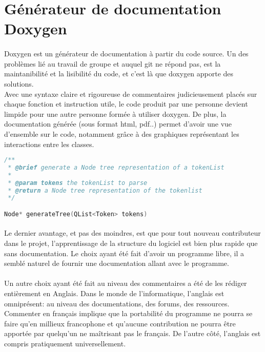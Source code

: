     \newpage

    \section{Générateur de documentation Doxygen}
        \paragraph{}
            Doxygen est un générateur de documentation à partir du code source. Un des problèmes lié au travail de groupe et auquel git ne répond pas, est la maintanibilité et la lisibilité du code, et c'est là que doxygen apporte des solutions.
            \\ Avec une syntaxe claire et rigoureuse de commentaires judicieusement placés sur chaque fonction et instruction utile, le code produit par une personne devient limpide pour une autre personne formée à utiliser doxygen. De plus, la documentation générée (sous format html, pdf..) permet d'avoir une vue d'ensemble sur le code, notamment grâce à des graphiques représentant les interactions entre les classes.

        \begin{lstlisting}[frame=single, language=C++, caption=Exemple de  commentaire utilisant la syntaxe de doxygen] 
/**
 * @brief generate a Node tree representation of a tokenList
 *
 * @param tokens the tokenList to parse
 * @return a Node tree representation of the tokenlist
 */

Node* generateTree(QList<Token> tokens)
        \end{lstlisting}


        \paragraph{}
            Le dernier avantage, et pas des moindres, est que pour tout nouveau contributeur dans le projet, l'apprentissage de la structure du logiciel est bien plus rapide que sans documentation. Le choix ayant été fait d'avoir un programme libre, il a semblé naturel de fournir une documentation allant avec le programme.
            
        \paragraph{}
            Un autre choix ayant été fait au niveau des commentaires a été de les rédiger entièrement en Anglais. Dans le monde de l'informatique, l'anglais est omniprésent: au niveau des documentations, des forums, des ressources. Commenter en français implique que la portabilité du programme ne pourra se faire qu'en millieux francophone et qu'aucune contribution ne pourra être apportée par quelqu'un ne maîtrisant pas le français. De l'autre côté, l'anglais est compris pratiquement universellement. 
        
